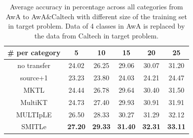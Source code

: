 \begin{table}[htbp]
  \centering
  \caption{Average accuracy in percentage across all categories from AwA to AwA\&Caltech with different size of the training set in target problem. Data of 4 classes in AwA is replaced by the data from Caltech in target problem.}
    \begin{tabular}{|c|c|c|c|c|c|}
    \hline
       \# per category    & 5     & 10    & 15    & 20    & 25 \\
    \hline
    no transfer &         24.02  &         26.25  &         29.06  &         30.07  &         31.20  \\
    source+1 &         23.23  &         23.80  &         24.03  &         24.21  &         24.47  \\
    MKTL  &         24.44  &         26.78  &         29.64  &         30.40  &         31.50  \\
    MultiKT &         24.73  &         27.40  &         29.93  &         30.91  &         31.91  \\
    MULTIpLE &         26.50  &         28.33  &         30.27  &         31.29  &         32.12  \\
    SMITLe &         \textbf{27.20}  &         \textbf{29.33}  &         \textbf{31.40}  &         \textbf{32.31}  &         \textbf{33.11}  \\
    \hline
    \end{tabular}%
  \label{tab:4c}%
\end{table}%

